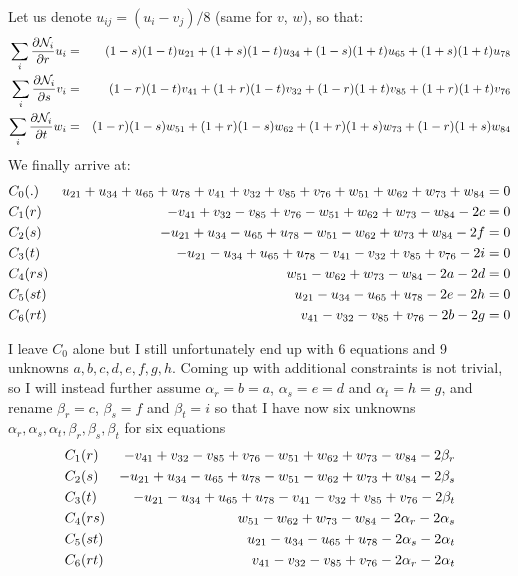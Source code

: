 Let us denote $u_{ij}=(u_i-v_j)/8$ (same for $v$, $w$), so that:
\begin{eqnarray}
\sum_i \frac{\partial {\mathcal{N}}_i}{\partial r} u_i 
&=& (1-s)(1-t)u_{21}
+ (1+s)(1-t)u_{34}
+ (1-s)(1+t)u_{65}
+ (1+s)(1+t)u_{78} \nonumber\\
\sum_i \frac{\partial {\mathcal{N}}_i}{\partial s} v_i 
&=& (1-r)(1-t)v_{41}
+ (1+r)(1-t)v_{32}
+ (1-r)(1+t)v_{85}
+ (1+r)(1+t)v_{76} \nonumber\\
\sum_i \frac{\partial {\mathcal{N}}_i}{\partial t} w_i 
&=& 
  (1-r)(1-s)w_{51}
+ (1+r)(1-s)w_{62}
+ (1+r)(1+s)w_{73}
+ (1-r)(1+s)w_{84} \nonumber
\end{eqnarray}
We finally arrive at:
\begin{eqnarray}
C_0   &(.)  &  u_{21} + u_{34} + u_{65} + u_{78} + v_{41} + v_{32} + v_{85} + v_{76} + w_{51} + w_{62} + w_{73} + w_{84} =0  \nonumber\\
C_1   &(r)  &  -v_{41} +v_{32} -v_{85} + v_{76} - w_{51} + w_{62} + w_{73} -w_{84} -2c =0\nonumber\\ 
C_2   &(s)  &  -u_{21} +u_{34} -u_{65} + u_{78} - w_{51} - w_{62} + w_{73} +w_{84} -2f =0 \nonumber\\ 
C_3   &(t)  &  -u_{21} -u_{34} +u_{65} + u_{78} - v_{41} - v_{32} + v_{85} +v_{76} -2i =0 \nonumber\\ 
C_4   &(rs) &  w_{51} -w_{62} +w_{73} - w_{84}  -2a -2d =0  \nonumber\\
C_5   &(st) &  u_{21} -u_{34} -u_{65} + u_{78}  -2e -2h =0  \nonumber\\
C_6   &(rt) &  v_{41} -v_{32} -v_{85} + v_{76}  -2b -2g =0  \nonumber
\end{eqnarray}

I leave $C_0$ alone but I still unfortunately end up with 6 equations and 9 unknowns $a,b,c,d,e,f,g,h$.
Coming up with additional constraints is not trivial, so I will instead further assume 
$\alpha_r=b=a$, $\alpha_s=e=d$ and $\alpha_t=h=g$, and rename 
$\beta_r=c$, $\beta_s=f$ and $\beta_t=i$ so that
I have now six unknowns $\alpha_r,\alpha_s,\alpha_t,\beta_r,\beta_s,\beta_t$ for six equations
\begin{eqnarray}
C_1   &(r)  &  -v_{41} +v_{32} -v_{85} + v_{76} - w_{51} + w_{62} + w_{73} -w_{84} -2\beta_r \nonumber\\ 
C_2   &(s)  &  -u_{21} +u_{34} -u_{65} + u_{78} - w_{51} - w_{62} + w_{73} +w_{84} -2\beta_s \nonumber\\ 
C_3   &(t)  &  -u_{21} -u_{34} +u_{65} + u_{78} - v_{41} - v_{32} + v_{85} +v_{76} -2\beta_t \nonumber\\ 
C_4   &(rs) &  w_{51} -w_{62} +w_{73} - w_{84}  -2\alpha_r -2\alpha_s   \nonumber\\
C_5   &(st) &  u_{21} -u_{34} -u_{65} + u_{78}  -2\alpha_s -2\alpha_t   \nonumber\\
C_6   &(rt) &  v_{41} -v_{32} -v_{85} + v_{76}  -2\alpha_r -2\alpha_t   \nonumber
\end{eqnarray}


